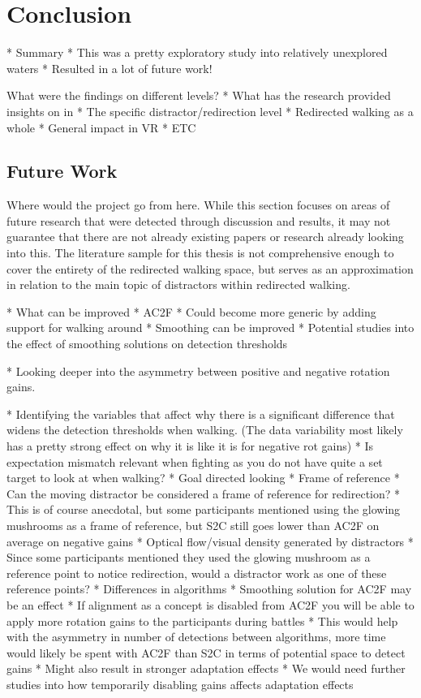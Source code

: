 \chapter{Conclusion}\label{chap:conclusion}
* Summary
* This was a pretty exploratory study into relatively unexplored waters
   * Resulted in a lot of future work!

What were the findings on different levels?
   * What has the research provided insights on in
      * The specific distractor/redirection level
      * Redirected walking as a whole
      * General impact in VR
      * ETC


\section{Future Work}\label{sec:futurework}
Where would the project go from here. While this section focuses on areas of future research that were detected through discussion and results, it may not guarantee that there are not already existing papers or research already looking into this. The literature sample for this thesis is not comprehensive enough to cover the entirety of the redirected walking space, but serves as an approximation in relation to the main topic of distractors within redirected walking. 

* What can be improved
* AC2F
   * Could become more generic by adding support for walking around
   * Smoothing can be improved
   * Potential studies into the effect of smoothing solutions on detection thresholds

* Looking deeper into the asymmetry between positive and negative rotation gains. 

* Identifying the variables that affect why there is a significant difference that widens the detection thresholds when walking. (The data variability most likely has a pretty strong effect on why it is like it is for negative rot gains)
   * Is expectation mismatch relevant when fighting as you do not have quite a set target to look at when walking?
      * Goal directed looking
   * Frame of reference
      * Can the moving distractor be considered a frame of reference for redirection?
      * This is of course anecdotal, but some participants mentioned using the glowing mushrooms as a frame of reference, but S2C still goes lower than AC2F on average on negative gains
      * Optical flow/visual density generated by distractors
         * Since some participants mentioned they used the glowing mushroom as a reference point to notice redirection, would a distractor work as one of these reference points?
   * Differences in algorithms
      * Smoothing solution for AC2F may be an effect
      * If alignment as a concept is disabled from AC2F you will be able to apply more rotation gains to the participants during battles
         * This would help with the asymmetry in number of detections between algorithms, more time would likely be spent with AC2F than S2C in terms of potential space to detect gains
         * Might also result in stronger adaptation effects
            * We would need further studies into how temporarily disabling gains affects adaptation effects

